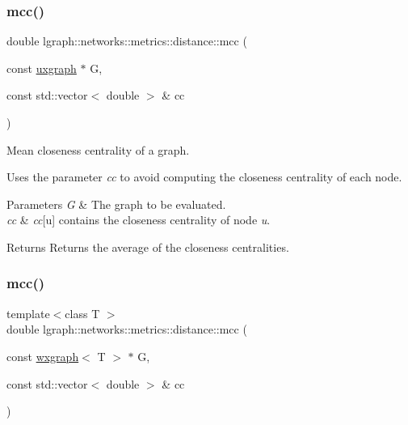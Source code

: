 \subsubsection{\texorpdfstring{mcc()}{mcc()}\hspace{0.1cm}{\footnotesize\ttfamily [3/4]}}
{\footnotesize\ttfamily double lgraph\+::networks\+::metrics\+::distance\+::mcc (\begin{DoxyParamCaption}\item[{const \hyperlink{classlgraph_1_1uxgraph}{uxgraph} $\ast$}]{G,  }\item[{const std\+::vector$<$ double $>$ \&}]{cc }\end{DoxyParamCaption})}



Mean closeness centrality of a graph. 

Uses the parameter {\itshape cc} to avoid computing the closeness centrality of each node.


\begin{DoxyParams}{Parameters}
{\em G} & The graph to be evaluated. \\
\hline
{\em cc} & {\itshape cc}\mbox{[}u\mbox{]} contains the closeness centrality of node {\itshape u}. \\
\hline
\end{DoxyParams}
\begin{DoxyReturn}{Returns}
Returns the average of the closeness centralities. 
\end{DoxyReturn}
\mbox{\label{namespacelgraph_1_1networks_1_1metrics_1_1distance_a917cd85d53ace1529957de1f73fa0e18}} 
\subsubsection{\texorpdfstring{mcc()}{mcc()}\hspace{0.1cm}{\footnotesize\ttfamily [4/4]}}
{\footnotesize\ttfamily template$<$class T $>$ \\
double lgraph\+::networks\+::metrics\+::distance\+::mcc (\begin{DoxyParamCaption}\item[{const \hyperlink{classlgraph_1_1wxgraph}{wxgraph}$<$ T $>$ $\ast$}]{G,  }\item[{const std\+::vector$<$ double $>$ \&}]{cc }\end{DoxyParamCaption})}



